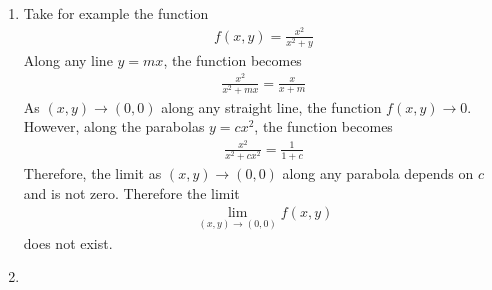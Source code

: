 \documentclass{article}
\begin{document}
\begin{enumerate}
\item 
Take for example the function
\begin{align*}
f(x,y) = \frac{x^2}{x^2+y}
\end{align*}
Along any line $y = mx$, the function becomes
\begin{align*}
\frac{x^2}{x^2+mx} = \frac{x}{x+m}
\end{align*}
As $(x,y) \rightarrow (0,0)$ along any straight line, the function $f(x,y) \rightarrow 0$. However, along the parabolas $y=cx^2$, the function becomes
\begin{align*}
\frac{x^2}{x^2+cx^2} = \frac{1}{1 + c}
\end{align*}
Therefore, the limit as $(x,y) \rightarrow (0,0)$ along any parabola depends on $c$ and is not zero. Therefore the limit 
\begin{align*}
\lim_{(x,y) \rightarrow (0,0)} f(x,y)
\end{align*}
does not exist. 

\item
\begin{enumerate}


\end{enumerate}
\end{enumerate}
\end{document}
